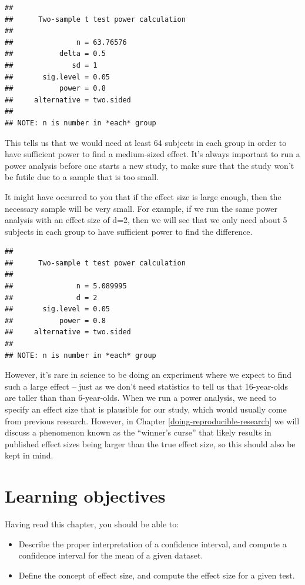 \documentclass[12pt,]{book}
\providecommand{\tightlist}{%
  \setlength{\itemsep}{0pt}\setlength{\parskip}{0pt}}
\begin{document}
\begin{verbatim}
## 
##      Two-sample t test power calculation 
## 
##               n = 63.76576
##           delta = 0.5
##              sd = 1
##       sig.level = 0.05
##           power = 0.8
##     alternative = two.sided
## 
## NOTE: n is number in *each* group
\end{verbatim}

This tells us that we would need at least 64 subjects in each group in order to have sufficient power to find a medium-sized effect. It's always important to run a power analysis before one starts a new study, to make sure that the study won't be futile due to a sample that is too small.

It might have occurred to you that if the effect size is large enough, then the necessary sample will be very small. For example, if we run the same power analysis with an effect size of d=2, then we will see that we only need about 5 subjects in each group to have sufficient power to find the difference.

\begin{verbatim}
## 
##      Two-sample t test power calculation 
## 
##               n = 5.089995
##               d = 2
##       sig.level = 0.05
##           power = 0.8
##     alternative = two.sided
## 
## NOTE: n is number in *each* group
\end{verbatim}

However, it's rare in science to be doing an experiment where we expect to find such a large effect -- just as we don't need statistics to tell us that 16-year-olds are taller than than 6-year-olds. When we run a power analysis, we need to specify an effect size that is plausible for our study, which would usually come from previous research. However, in Chapter \ref{doing-reproducible-research} we will discuss a phenomenon known as the ``winner's curse'' that likely results in published effect sizes being larger than the true effect size, so this should also be kept in mind.

\hypertarget{learning-objectives-1}{%
\section{Learning objectives}\label{learning-objectives-1}}

Having read this chapter, you should be able to:

\begin{itemize}
\tightlist
\item
  Describe the proper interpretation of a confidence interval, and compute a confidence interval for the mean of a given dataset.
\item
  Define the concept of effect size, and compute the effect size for a given test.
\end{itemize}
\end{document}
